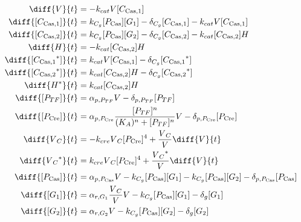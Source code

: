 \begin{align}
\diff{\vectorGen{}}{t} & = - \casCutRate{{}}\vectorGen{}\conc{\cplx{\cas}{1}}\\
\diff{\conc{\cplx{\cas}{1}}}{t} & =  \gRnaBind{}\conc{\proSp{\cas{}}}\conc{\gRna{1}} - \casCompDegradeRate{}\conc{\cplx{\cas}{1}} - \casCutRate{{}}\vectorGen{}\conc{\cplx{\cas}{1}}\\
\diff{\conc{\cplx{\cas}{2}}}{t} & =  \gRnaBind{}\conc{\proSp{\cas{}}}\conc{\gRna{2}} - \casCompDegradeRate{}\conc{\cplx{\cas}{2}} - \casCutRate{{}}\conc{\cplx{\cas}{2}}\hostGen{}\\
\diff{\hostGen{}}{t} & = - \casCutRate{{}}\conc{\cplx{\cas}{2}}\hostGen{}\\
\diff{\conc{\bound{\cplx{\cas}{1}}}}{t} & =  \casCutRate{{}}\vectorGen{}\conc{\cplx{\cas}{1}} - \casCompDegradeRate{}\conc{\bound{\cplx{\cas}{1}}}\\
\diff{\conc{\bound{\cplx{\cas}{2}}}}{t} & =  \casCutRate{{}}\conc{\cplx{\cas}{2}}\hostGen{} - \casCompDegradeRate{}\conc{\bound{\cplx{\cas}{2}}}\\
\diff{\edited{\hostGen{}}}{t} & =  \casCutRate{{}}\conc{\cplx{\cas}{2}}\hostGen{}\\
\diff{\conc{\proSp{TF}}}{t} & =  \txtlRate{\proSp{TF}}\vectorGen{} - \proDegradeRate{\proSp{TF}}\conc{\proSp{TF}}\\
\diff{\conc{\proSp{\cre{}}}}{t} & =  \txtlRate{\proSp{\cre{}}}\frac{\conc{\proSp{TF}}^n}{(K_A)^n + \conc{\proSp{TF}}^n}\vectorGen{} - \proDegradeRate{\proSp{\cre{}}}\conc{\proSp{\cre{}}}\\
\diff{\vectorGen{}_C}{t} & = - \creCutRate{} \vectorGen{}_C \conc{\proSp{\cre{}}}^4 + \frac{\vectorGen{}_C}{\vectorGen{}} \diff{\vectorGen{}}{t}\\
\diff{\edited{\vectorGen{}_C}}{t} & =  \creCutRate{} \vectorGen{}_C \conc{\proSp{\cre{}}}^4 + \frac{\edited{\vectorGen{}_C}}{\vectorGen{}} \diff{\vectorGen{}}{t}\\
\diff{\conc{\proSp{\cas{}}}}{t} & =  \txtlRate{\proSp{\cas{}}}\vectorGen{} - \gRnaBind{}\conc{\proSp{\cas{}}}\conc{\gRna{1}} - \gRnaBind{}\conc{\proSp{\cas{}}}\conc{\gRna{2}} - \proDegradeRate{\proSp{\cas{}}}\conc{\proSp{\cas{}}}\\
\diff{\conc{\gRna{1}}}{t} & =  \txRate{\gRna{1}}\frac{\vectorGen{}_C}{\vectorGen{}}\vectorGen{} - \gRnaBind{}\conc{\proSp{\cas{}}}\conc{\gRna{1}} - \rnaDegradeRate{}\conc{\gRna{1}}\\
\diff{\conc{\gRna{2}}}{t} & =  \txRate{\gRna{2}}\vectorGen{} - \gRnaBind{}\conc{\proSp{\cas{}}}\conc{\gRna{2}} - \rnaDegradeRate{}\conc{\gRna{2}}
\end{align}

